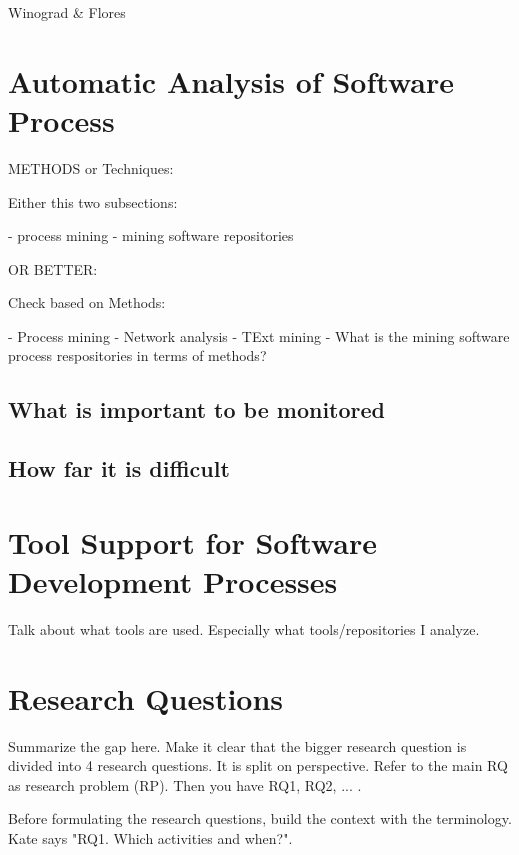 Winograd \& Flores~\citep{Winograd1986a}

\section{Automatic Analysis of Software Process}
\label{sec:ch2-sw-p-monitoring}


METHODS or Techniques:

Either this
two subsections:

- process mining
- mining software repositories

OR BETTER:

Check based on Methods:

- Process mining
- Network analysis
- TExt mining
- What is the mining software process respositories in terms of methods? 

\subsection{What is important to be monitored}

\subsection{How far it is difficult}

\section{Tool Support for Software Development Processes}
\label{sec:ch2-tool-support}

Talk about what tools are used.
Especially what tools/repositories I analyze. 


\section{Research Questions}
\label{sec:ch2-research-questions}

Summarize the gap here. Make it clear that the bigger research question is divided into 4 research questions. It is split on perspective. 
Refer to the main RQ as research problem (RP). Then you have RQ1, RQ2, ... .


Before formulating the research questions, build the context with the terminology. Kate says "RQ1. Which activities and when?".


